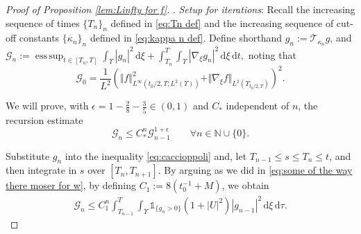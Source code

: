 \documentclass[11pt,a4paper,reqno]{amsart}
\theoremstyle{remark}
\theoremstyle{definition}
\numberwithin{equation}{section}
\DeclareMathOperator{\esssup}{ess \, sup}
\newcommand{\bxi}{\xi}
\renewcommand{\d}{\, \mathrm{d} }
\begin{document}
\begin{proof}[Proof of Proposition \ref{lem:Linfty for f}]
    \smallskip 

    . \textit{Setup for iterations}: Recall the increasing sequence of times $\{T_n\}_n$ defined in \eqref{eq:Tn def} and the increasing sequence of cut-off constants $\{\kappa_n\}_n$ defined in \eqref{eq:kappa n def}. Define shorthand $g_n := \mathscr{T}_{\kappa_n} g$, and $\mathscr{G}_n := \esssup_{t \in [T_n,T]}  \int_\Upsilon |g_n|^2 \d \bxi  + \int_{T_n}^T \int_\Upsilon |\nabla_{\bxi}g_n|^2 \d \bxi \d t, $ noting that 
\begin{equation}\label{eq:G0 def}
\mathscr{G}_0 = \frac{1}{L^{2}} (\Vert f \Vert_{L^\infty(t_0/2,T;L^2(\Upsilon))}^2 + \Vert \nabla_{\bxi} f \Vert_{L^2(\Upsilon_{t_0/2,T})})^2. 
\end{equation}

We will prove, with $\epsilon = 1-\frac{2}{8}-\frac{3}{5} \in (0,1)$ and $C_*$ independent of $n$, the recursion estimate 
\begin{equation}\label{eq:recursion estimate moser}
    \mathscr{G}_{n} \leq C_*^n \mathscr{G}_{n-1}^{1+\epsilon} \qquad \forall n \in \mathbb{N} \cup \{0\}.
\end{equation}

Substitute $g_{n}$ into the inequality \eqref{eq:caccioppoli} and, let $T_{n-1} \leq s \leq T_{n} \leq t$, and then integrate in $s$ over $[T_{n},T_{n+1}]$. By arguing as we did in \eqref{eq:some of the way there moser for w}, by defining $C_1 :=8(t_0^{-1} + M)$, we obtain 
    \begin{equation}\label{eq:some of the way there moser}
            \begin{aligned}
         \mathscr{G}_n \leq C_1^n \int_{T_{n-1}}^T \int_{\Upsilon} \mathds{1}_{\{g_n > 0\}} (1 + |U|^2) |g_{n-1}|^2 \d \bxi \d \tau. 
        \end{aligned}
\end{equation}


   \smallskip 


\end{proof}
\end{document}
